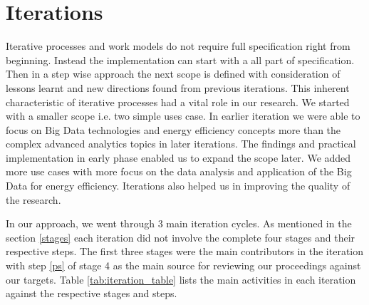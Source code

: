 \section{Iterations} \label{iteration}
Iterative processes and work models do not require full specification right from beginning. Instead the implementation can start with a all part of specification. Then in a step wise approach the next scope is defined with consideration of lessons learnt and new directions found from previous iterations. This inherent characteristic of iterative processes had a vital role in our research. We started with a smaller scope i.e. two simple uses case. In earlier iteration we were able to focus on Big Data technologies and energy efficiency concepts more than the complex advanced analytics topics in later iterations. The findings and practical implementation in early phase enabled us to expand the scope later. We added more use cases with more focus on the data analysis and application of the Big Data for energy efficiency. Iterations also helped us in improving the quality of the research. 

In our approach, we went through 3 main iteration cycles. As mentioned in the section \ref{stages} each iteration did not involve the complete four stages and their respective steps. The first three stages were the main contributors in the iteration with step \ref{ps} of stage 4 as the main source for reviewing our proceedings against our targets. Table \ref{tab:iteration_table} lists the main activities in each iteration against the respective stages and steps.    


